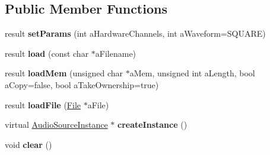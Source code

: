 \subsection*{Public Member Functions}
\begin{DoxyCompactItemize}
\item 
\mbox{\label{class_so_loud_1_1_monotone_a8bc94c64a4a8e13424f80db6b16a7529}} 
result {\bfseries set\+Params} (int a\+Hardware\+Channels, int a\+Waveform=S\+Q\+U\+A\+RE)
\item 
\mbox{\label{class_so_loud_1_1_monotone_a19e67a5264c13d870f4c3530b77bc734}} 
result {\bfseries load} (const char $\ast$a\+Filename)
\item 
\mbox{\label{class_so_loud_1_1_monotone_aae96f6f83f82c2f58b181cac57032403}} 
result {\bfseries load\+Mem} (unsigned char $\ast$a\+Mem, unsigned int a\+Length, bool a\+Copy=false, bool a\+Take\+Ownership=true)
\item 
\mbox{\label{class_so_loud_1_1_monotone_ad78047cde881908f8b9c4a198243aa56}} 
result {\bfseries load\+File} (\mbox{\hyperlink{class_so_loud_1_1_file}{File}} $\ast$a\+File)
\item 
\mbox{\label{class_so_loud_1_1_monotone_a8d694dbeb32353ceb9f0c40e88985a24}} 
virtual \mbox{\hyperlink{class_so_loud_1_1_audio_source_instance}{Audio\+Source\+Instance}} $\ast$ {\bfseries create\+Instance} ()
\item 
\mbox{\label{class_so_loud_1_1_monotone_a2be81352ed0fc38f03530aa241e6a353}} 
void {\bfseries clear} ()
\end{DoxyCompactItemize}
